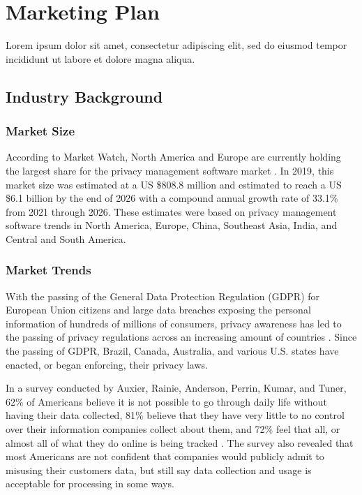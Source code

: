 {\let\cleardoublepage\relax \chapter{Marketing Plan}}


Lorem ipsum dolor sit amet, consectetur adipiscing elit, sed do eiusmod tempor incididunt ut labore et dolore magna aliqua.


\section{Industry Background}

\subsection{Market Size}

According to Market Watch, North America and Europe are currently holding the largest share for the privacy management software market \cite{mw.2020}. In 2019, this market size was estimated at a US \$808.8 million and estimated to reach a US \$6.1 billion by the end of 2026 with a compound annual growth rate of 33.1\% from 2021 through 2026. These estimates were based on privacy management software trends in North America, Europe, China, Southeast Asia, India, and Central and South America.

\subsection{Market Trends}

With the passing of the General Data Protection Regulation (GDPR) for European Union citizens and large data breaches exposing the personal information of hundreds of millions of consumers, privacy awareness has led to the passing of privacy regulations across an increasing amount of countries \cite{privacypolicies.2019}. Since the passing of GDPR, Brazil, Canada, Australia, and various U.S. states have enacted, or began enforcing, their privacy laws.

In a survey conducted by Auxier, Rainie, Anderson, Perrin, Kumar, and Tuner, 62\% of Americans believe it is not possible to go through daily life without having their data collected, 81\% believe that they have very little to no control over their information companies collect about them, and 72\% feel that all, or almost all of what they do online is being tracked \cite{pewresearch.2019}. The survey also revealed that most Americans are not confident that companies would publicly admit to misusing their customers data, but still say data collection and usage is acceptable for processing in some ways.

